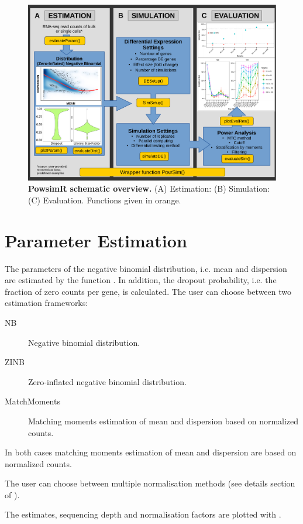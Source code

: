 \documentclass{article}\usepackage[]{graphicx}\usepackage[usenames,dvipsnames]{color}
\begin{document}
\begin{figure}[h]
\centering
\includegraphics[width=0.95\linewidth]{powsim_schematic.pdf}
\caption{\textbf{PowsimR schematic overview.} (A) Estimation: (B) Simulation: (C) Evaluation. Functions given in orange.}
\label{fig:powsim_scheme}
\end{figure}

\section{Parameter Estimation}

The parameters of the negative binomial distribution, i.e. mean and dispersion are estimated by the function . In addition, the dropout probability, i.e. the fraction of zero counts per gene, is calculated.
The user can choose between two estimation frameworks:
\begin{description}
\item[NB] Negative binomial distribution.
\item[ZINB] Zero-inflated negative binomial distribution.
\item[MatchMoments] Matching moments estimation of mean and dispersion based on normalized counts.
\end{description}

In both cases matching moments estimation of mean and dispersion are based on normalized counts.

The user can choose between multiple normalisation methods (see details section of ).

The estimates, sequencing depth and normalisation factors are plotted with .
\end{document}

